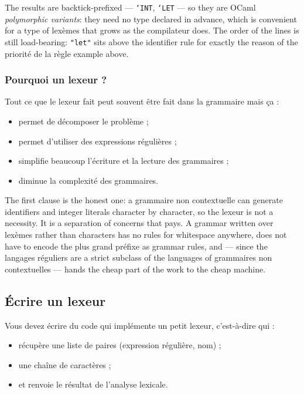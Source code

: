 \begin{remark}
  The results are backtick-prefixed --- \texttt{`INT}, \texttt{`LET} --- so they
  are OCaml \emph{polymorphic variants}: they need no type declared in advance,
  which is convenient for a type of lexèmes that grows as the compilateur does.
  The order of the lines is still load-bearing: \texttt{"let"} sits above the
  identifier rule for exactly the reason of the priorité de la règle example
  above.
\end{remark}

\subsubsection{Pourquoi un lexeur ?}
\begin{conclusion}
  Tout ce que le lexeur fait peut souvent être fait dans la grammaire mais ça :
  \begin{itemize}
    \item permet de décomposer le problème ;
    \item permet d'utiliser des expressions régulières ;
    \item simplifie beaucoup l'écriture et la lecture des grammaires ;
    \item diminue la complexité des grammaires.
  \end{itemize}
\end{conclusion}

The first clause is the honest one: a grammaire non contextuelle can generate
identifiers and integer literals character by character, so the lexeur is not a
necessity. It is a separation of concerns that pays. A grammar written over
lexèmes rather than characters has no rules for whitespace anywhere, does not
have to encode the plus grand préfixe as grammar rules, and --- since the
langages réguliers are a strict subclass of the languages of grammaires non
contextuelles --- hands the cheap part of the work to the cheap machine.

\subsection{Écrire un lexeur}
\begin{problem}[Objectif]
  Vous devez écrire du code qui implémente un petit lexeur, c'est-à-dire qui :
  \begin{itemize}
    \item récupère une liste de paires (expression régulière, nom) ;
    \item une chaîne de caractères ;
    \item et renvoie le résultat de l'analyse lexicale.
  \end{itemize}
\end{problem}


